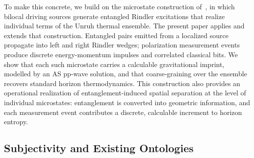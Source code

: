 \documentclass[12pt,a4paper]{article}
\begin{document}

To make this concrete, we build on the microstate construction of~\cite{player2025driving}, in which bilocal driving sources generate entangled Rindler excitations that realize individual terms of the Unruh thermal ensemble. The present paper applies and extends that construction. Entangled pairs emitted from a localized source propagate into left and right Rindler wedges; polarization measurement events produce discrete energy-momentum impulses and correlated classical bits. We show that each such microstate carries a calculable gravitational imprint, modelled by an AS pp-wave solution, and that coarse-graining over the ensemble recovers standard horizon thermodynamics. This construction also provides an operational realization of entanglement-induced spatial separation at the level of individual microstates: entanglement is converted into geometric information, and each measurement event contributes a discrete, calculable increment to horizon entropy.


\subsection{Subjectivity and Existing Ontologies}
\end{document}

